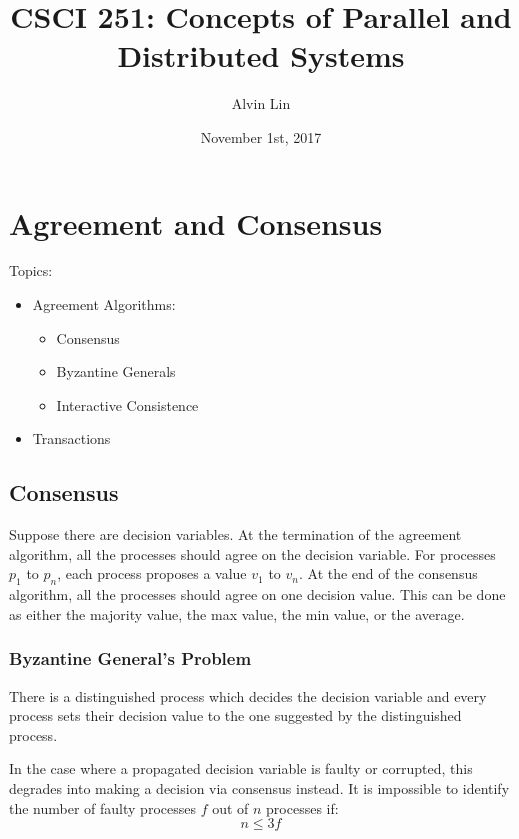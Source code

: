\documentclass{math}
\title{CSCI 251: Concepts of Parallel and Distributed Systems}
\author{Alvin Lin}
\date{November 1st, 2017}
\begin{document}
\maketitle

\section*{Agreement and Consensus}
Topics:
\begin{itemize}
  \item Agreement Algorithms:
    \begin{itemize}
      \item Consensus
      \item Byzantine Generals
      \item Interactive Consistence
    \end{itemize}
  \item Transactions
\end{itemize}

\subsection*{Consensus}
Suppose there are decision variables. At the termination of the agreement
algorithm, all the processes should agree on the decision variable. For
processes \( p_1 \) to \( p_n \), each process proposes a value \( v_1 \) to
\( v_n \). At the end of the consensus algorithm, all the processes should
agree on one decision value. This can be done as either the majority value,
the max value, the min value, or the average.

\subsubsection*{Byzantine General's Problem}
There is a distinguished process which decides the decision variable and every
process sets their decision value to the one suggested by the distinguished
process.
\begin{center}
\end{center}
In the case where a propagated decision variable is faulty or corrupted, this
degrades into making a decision via consensus instead. It is impossible to
identify the number of faulty processes \( f \) out of \( n \) processes if:
\[ n\le3f \]
\end{document}
